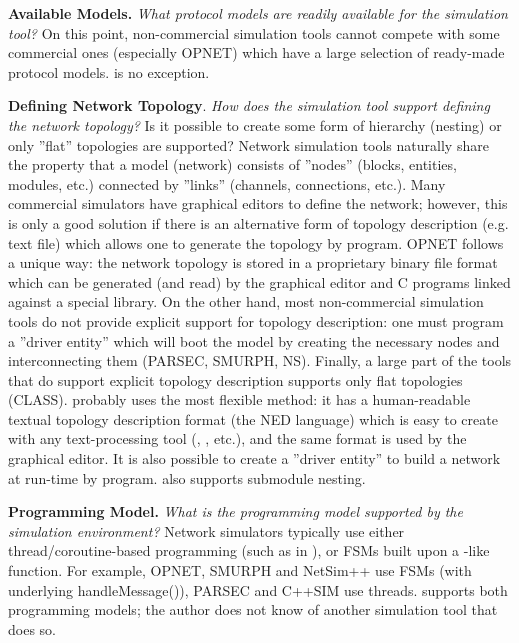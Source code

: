 \textbf{Available Models.} \textit{What protocol models are readily available 
for the simulation tool?} On this point, non-commercial simulation 
tools cannot compete with some commercial ones (especially OPNET) 
which have a large selection of ready-made protocol models. {\opp} 
is no exception. 


\textbf{Defining Network Topology}. \textit{How does the simulation
  tool support defining the network topology?} Is it possible to
create some form of hierarchy (nesting) or only ''flat'' topologies
are supported? Network simulation tools naturally share the property
that a model (network) consists of ''nodes'' (blocks, entities,
modules, etc.) connected by ''links'' (channels, connections, etc.).
Many commercial simulators have graphical editors to define the
network; however, this is only a good solution if there is an
alternative form of topology description (e.g. text file) which allows
one to generate the topology by program. OPNET follows a unique way:
the network topology is stored in a proprietary binary file format
which can be generated (and read) by the graphical editor and C
programs linked against a special library. On the other hand, most
non-commercial simulation tools do not provide explicit support for
topology description: one must program a ''driver entity'' which will
boot the model by creating the necessary nodes and interconnecting
them (PARSEC, SMURPH, NS). Finally, a large part of the tools that do
support explicit topology description supports only flat topologies
(CLASS). {\opp} probably uses the most flexible method: it has a
human-readable textual topology description format (the NED language)
which is easy to create with any text-processing tool (,
, etc.), and the same format is used by the graphical
editor. It is also possible to create a ''driver entity'' to build a
network at run-time by program. {\opp} also supports submodule
nesting.


\textbf{Programming Model.} \textit{What is the programming model supported 
by the simulation environment?} Network simulators typically use 
either thread/coroutine-based programming (such as  
in {\opp}), or FSMs built upon a -like function. 
For example, OPNET, SMURPH and NetSim++ use FSMs (with underlying 
handleMessage()), PARSEC and C++SIM use threads. {\opp} supports 
both programming models; the author does not know of another 
simulation tool that does so.


